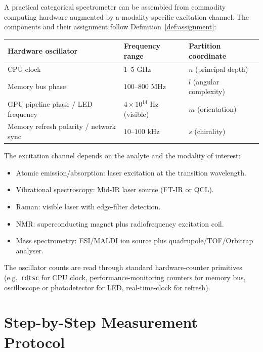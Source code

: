 \documentclass[11pt,a4paper]{article}
\theoremstyle{thmstyle}
\theoremstyle{axiomstyle}
\theoremstyle{definition}
\theoremstyle{remark}
\begin{document}
A practical categorical spectrometer can be assembled from commodity computing hardware augmented by a modality-specific excitation channel. The components and their assignment follow Definition~\ref{def:assignment}:

\begin{center}
\begin{tabular}{lll}
\toprule
Hardware oscillator & Frequency range & Partition coordinate\\
\midrule
CPU clock & $1$--$5$ GHz & $n$ (principal depth)\\
Memory bus phase & $100$--$800$ MHz & $l$ (angular complexity)\\
GPU pipeline phase / LED frequency & $4\times 10^{14}$ Hz (visible) & $m$ (orientation)\\
Memory refresh polarity / network sync & $10$--$100$ kHz & $s$ (chirality)\\
\bottomrule
\end{tabular}
\end{center}

The excitation channel depends on the analyte and the modality of interest:
\begin{itemize}[nosep]
\item Atomic emission/absorption: laser excitation at the transition wavelength.
\item Vibrational spectroscopy: Mid-IR laser source (FT-IR or QCL).
\item Raman: visible laser with edge-filter detection.
\item NMR: superconducting magnet plus radiofrequency excitation coil.
\item Mass spectrometry: ESI/MALDI ion source plus quadrupole/TOF/Orbitrap analyser.
\end{itemize}

The oscillator counts are read through standard hardware-counter primitives (e.g.\ \texttt{rdtsc} for CPU clock, performance-monitoring counters for memory bus, oscilloscope or photodetector for LED, real-time-clock for refresh).

\section{Step-by-Step Measurement Protocol}
\label{sec:methods_protocol}
\end{document}
